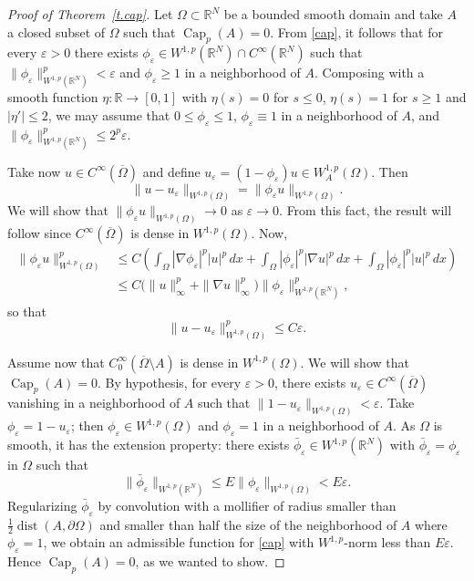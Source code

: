 \documentclass[11pt]{amsart}
\theoremstyle{remark}
\numberwithin{equation}{section}
\newcommand{\R}{\mathbb{R}}
\DeclareMathOperator{\capa}{Cap}
\DeclareMathOperator{\dist}{dist}
\begin{document}
\begin{proof}[Proof of Theorem~\ref{t.cap}]
Let $\Omega\subset\R^N$ be a bounded smooth domain and take $A$ a closed subset of $\Omega$ such that $\capa_p(A)=0$. From \eqref{cap}, it follows that for every $\varepsilon>0$ there exists $\phi_\varepsilon\in W^{1,p}(\R^N)\cap C^\infty(\R^N)$ such that $\|\phi_\varepsilon\|^p_{W^{1,p}(\R^N)}<\varepsilon$ and $\phi_\varepsilon\ge1$ in a neighborhood of $A$. Composing with a smooth function $\eta:\R\to[0,1]$ with $\eta(s)=0$ for $s\le0$, $\eta(s)=1$ for $s\ge1$ and $|\eta'|\le2$, we may assume that $0\le\phi_\varepsilon\le1$, $\phi_\varepsilon\equiv1$ in a neighborhood of $A$, and $\|\phi_\varepsilon\|^p_{W^{1,p}(\R^N)}\le2^p\varepsilon$.

Take now $u\in C^\infty(\overline\Omega)$ and define $u_\varepsilon=(1-\phi_\varepsilon)u\in W^{1,p}_A(\Omega)$. Then
\[
\|u-u_\varepsilon\|_{W^{1,p}(\Omega)}=\|\phi_\varepsilon u\|_{W^{1,p}(\Omega)}.
\]
We will show that $\|\phi_\varepsilon u\|_{W^{1,p}(\Omega)}\to0$ as $\varepsilon\to0$. From this fact, the result will follow since $C^\infty(\overline\Omega)$ is dense in $W^{1,p}(\Omega)$. Now,
\begin{align*}
\|\phi_\varepsilon u\|^p_{W^{1,p}(\Omega)}&\le C\left(\int_\Omega|\nabla\phi_\varepsilon|^p|u|^p\,dx+\int_\Omega|\phi_\varepsilon|^p|\nabla u|^p\,dx+\int_\Omega|\phi_\varepsilon|^p|u|^p\,dx\right)\\
&\le C\big(\|u\|^p_\infty+\|\nabla u\|^p_\infty\big)\|\phi_\varepsilon\|^p_{W^{1,p}(\R^N)},
\end{align*}
so that
\begin{equation}\label{est}
\|u-u_\varepsilon\|^p_{W^{1,p}(\Omega)}\le C\varepsilon.
\end{equation}

Assume now that $C^\infty_0(\overline\Omega\setminus A)$ is dense in $W^{1,p}(\Omega)$. We will show that $\capa_p(A)=0$. By hypothesis, for every $\varepsilon>0$, there exists $u_\varepsilon\in C^\infty(\overline\Omega)$ vanishing in a neighborhood of $A$ such that $\|1-u_\varepsilon\|_{W^{1,p}(\Omega)}<\varepsilon$. Take $\phi_\varepsilon=1-u_\varepsilon$; then $\phi_\varepsilon\in W^{1,p}(\Omega)$ and $\phi_\varepsilon=1$ in a neighborhood of $A$. As $\Omega$ is smooth, it has the extension property: there exists $\bar\phi_\varepsilon\in W^{1,p}(\R^N)$ with $\bar\phi_\varepsilon=\phi_\varepsilon$ in $\Omega$ such that
\[
\|\bar\phi_\varepsilon\|_{W^{1,p}(\R^N)}\le E\|\phi_\varepsilon\|_{W^{1,p}(\Omega)}<E\varepsilon.
\]
Regularizing $\bar\phi_\varepsilon$ by convolution with a mollifier of radius smaller than $\frac12\dist(A,\partial\Omega)$ and smaller than half the size of the neighborhood of $A$ where $\phi_\varepsilon=1$, we obtain an admissible function for \eqref{cap} with $W^{1,p}$-norm less than $E\varepsilon$. Hence $\capa_p(A)=0$, as we wanted to show.
\end{proof}
\end{document}
